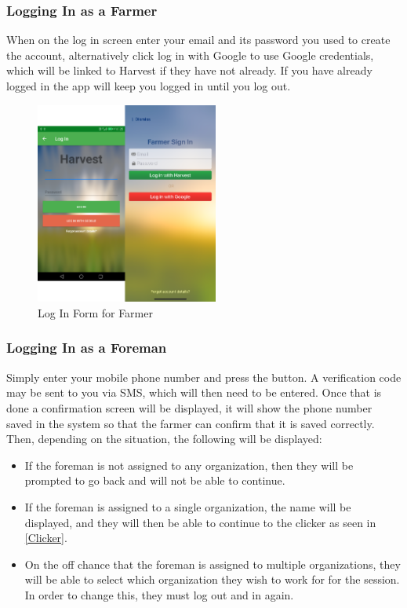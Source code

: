 \documentclass[11pt]{article}
\begin{document}
\subsubsection{Logging In as a Farmer}
When on the log in screen enter your email and its password you used to create the account, alternatively click log in with Google to use Google credentials, which will be linked to Harvest if they have not already. If you have already logged in the app will keep you logged in until you log out.
\begin{figure}[h]
 \centering
 \includegraphics[width=6cm, keepaspectratio]{Images/mobileLoginFarmer.png}
 \caption{Log In Form for Farmer}
 \label{LogInMobile}
\end{figure}

\subsubsection{Logging In as a Foreman}

Simply enter your mobile phone number and press the button. A verification code may be sent to you via SMS, which will then need to be entered. Once that is done a confirmation screen will be displayed, it will show the phone number saved in the system so that the farmer can confirm that it is saved correctly. Then, depending on the situation, the following will be displayed:
\begin{itemize}
 \item If the foreman is not assigned to any organization, then they will be prompted to go back and will not be able to continue.
 \item If the foreman is assigned to a single organization, the name will be displayed, and they will then be able to continue to the clicker as seen in \ref{Clicker}.
 \item On the off chance that the foreman is assigned to multiple organizations, they will be able to select which organization they wish to work for for the session. In order to change this, they must log out and in again.
\end{itemize}
\end{document}
